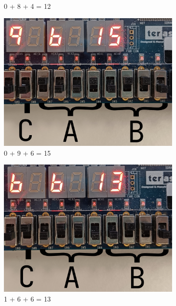 \documentclass{article}
\begin{document}
\begin{figure}[h]
\begin{subfigure}{0.4\textwidth}
        \caption{0 + 8 + 4 = 12}
        \label{fig:T05pic2}
    \end{subfigure}
    \begin{subfigure}{0.4\textwidth}
        \centering
        \includegraphics[width=1\textwidth]{Figures/Part5-0_9_6.jpg}
        \caption{0 + 9 + 6 = 15}
        \label{fig:T05pic3}
    \end{subfigure}
    \hfill
    \begin{subfigure}{0.4\textwidth}
        \centering
        \includegraphics[width=1\textwidth]{Figures/Part5-1_6_6.jpg}
        \caption{1 + 6 + 6 = 13}
        \label{fig:T05pic4}
    \end{subfigure}
    \begin{subfigure}{0.4\textwidth}

\end{subfigure}
\end{figure}
\end{document}

